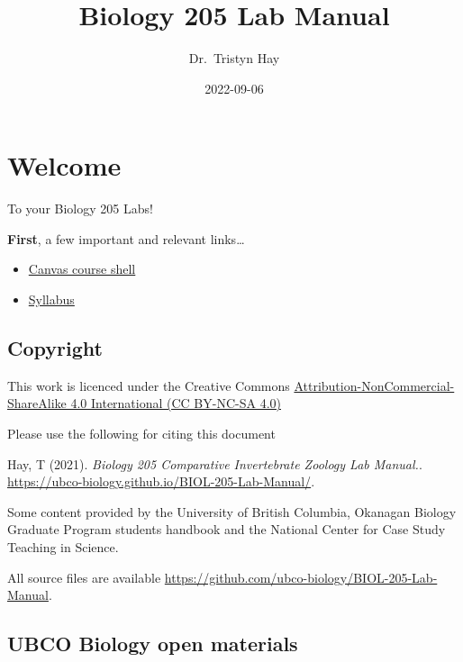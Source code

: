 \documentclass[
]{book}
\title{Biology 205 Lab Manual}
\author{Dr.~Tristyn Hay}
\date{2022-09-06}
\providecommand{\tightlist}{%
  \setlength{\itemsep}{0pt}\setlength{\parskip}{0pt}}
\begin{document}
\maketitle

{
\setcounter{tocdepth}{1}
\tableofcontents
}
\hypertarget{welcome}{%
\chapter*{Welcome}\label{welcome}}

To your Biology 205 Labs!

\textbf{First}, a few important and relevant links\ldots{}

\begin{itemize}
\tightlist
\item
  \href{https://canvas.ubc.ca/courses/113910}{Canvas course shell}
\item
  \href{https://canvas.ubc.ca/courses/113910/files/21718741?module_item_id=4662232}{Syllabus}
\end{itemize}

\hypertarget{copyright}{%
\section*{Copyright}\label{copyright}}

This work is licenced under the Creative Commons \href{https://creativecommons.org/licenses/by-nc-sa/4.0/}{Attribution-NonCommercial-ShareAlike 4.0 International (CC BY-NC-SA 4.0)}

Please use the following for citing this document

Hay, T (2021). \emph{Biology 205 Comparative Invertebrate Zoology Lab Manual.}. \url{https://ubco-biology.github.io/BIOL-205-Lab-Manual/}.

Some content provided by the University of British Columbia, Okanagan Biology Graduate Program students handbook and the National Center for Case Study Teaching in Science.

All source files are available \url{https://github.com/ubco-biology/BIOL-205-Lab-Manual}.

\hypertarget{ubco-biology-open-materials}{%
\section*{UBCO Biology open materials}\label{ubco-biology-open-materials}}
\end{document}
